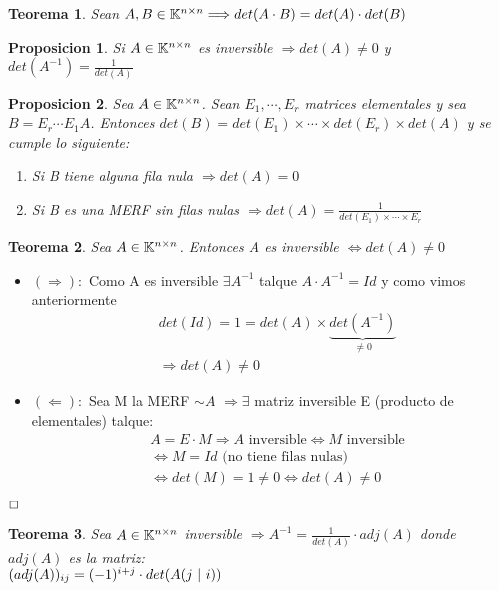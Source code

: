 \documentclass[]{article}
\newtheorem{theorem}{Teorema}
\newtheorem{proposition}{Proposicion}[theorem]
\newenvironment{proof}{\noindent{\bf Prueba:}}{$\hfill \Box$ \vspace{10pt}}
\newcommand{\ida}{\Longrightarrow}
\newcommand{\vuelta}{\Longleftarrow}
\begin{document}
\begin{theorem}
    Sean $A,B \in \mtx{n}{n} \ida det(A \cdot B)=det(A) \cdot det(B)$    
\end{theorem}
\begin{proposition}
    Si $A \in \text{$\mathbb{K}^{n \times n}$}$ es inversible $\ida det(A)\neq0$ y $det(A^{-1})=\frac{1}{det(A)}$
\end{proposition}
\begin{proposition}
    Sea $A \in \text{$\mathbb{K}^{n \times n}$}$. Sean $E_1,\cdots,E_r$ matrices elementales y sea $B=E_r \cdots E_1A$.
    Entonces $det(B)=det(E_1)\times \cdots \times det(E_r)\times det(A)$ y se cumple lo siguiente:
    \begin{enumerate}
        \item Si B tiene alguna fila nula $\ida det(A)=0$
        \item Si B es una MERF sin filas nulas $\ida det(A)=\frac{1}{det(E_1)\times\cdots\times E_r}$
    \end{enumerate}
\end{proposition}
\begin{theorem}
    Sea $A \in \text{$\mathbb{K}^{n \times n}$}$. Entonces A es inversible $\iff det(A)\neq 0$
\end{theorem}
\begin{proof}
    \begin{itemize}
        \item $(\ida):$ Como A es inversible $\exists A^{-1}$ talque $A\cdot A^{-1}=Id$ y como vimos anteriormente
        \begin{align*}
            &det(Id)=1=det(A)\times \underset{\neq 0}{\underbrace{det(A^{-1})}}\\
            &\ida det(A)\neq 0
        \end{align*}
        \item $(\vuelta):$ Sea M la MERF $\sim A$ $\ida \exists$ matriz inversible E (producto de elementales) talque:
        \begin{align*}
            &A=E\cdot M \ida A \text{ inversible} \iff M \text{ inversible}\\
            &\iff M=Id \text{ (no tiene filas nulas)}\\
            &\iff det(M)=1 \neq 0 \iff det(A)\neq 0
        \end{align*}
    \end{itemize}
\end{proof}

\begin{theorem}
    Sea $A \in \text{$\mathbb{K}^{n \times n}$}$ inversible $\ida A^{-1}=\frac{1}{det(A)} \cdot adj(A)$ donde $adj(A)$ es la matriz:\\
    $(adj(A))_{ij}= (-1)^{i+j} \cdot det(A(j \text{ $|$ } i))$
\end{theorem}
\end{document}
